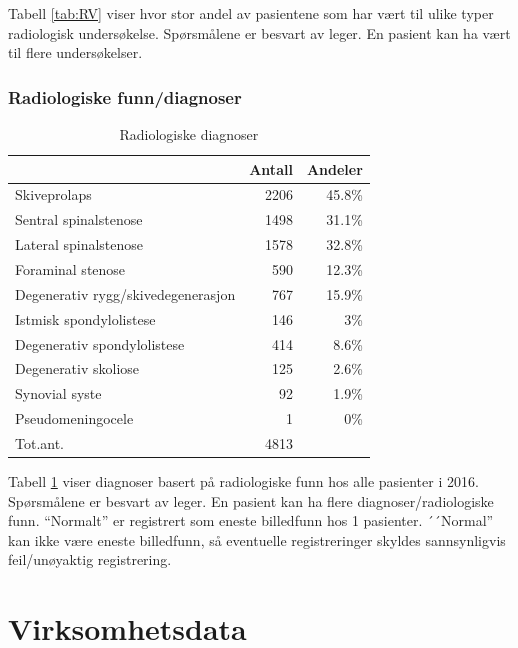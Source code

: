 \documentclass [norsk,a4paper,twoside]{article}\usepackage[]{graphicx}\usepackage[]{color}
\begin{document}
Tabell \ref{tab:RV} viser hvor stor andel av pasientene som har vært til ulike typer 
radiologisk undersøkelse. 
Spørsmålene er besvart av leger. En pasient kan ha vært til flere undersøkelser.


\subsubsection{Radiologiske funn/diagnoser}


\begin{table}[ht]
\centering
\begin{tabular}{lrr}
  \hline
 & Antall & Andeler \\ 
  \hline
Skiveprolaps & 2206 & 45.8\% \\ 
  Sentral spinalstenose & 1498 & 31.1\% \\ 
  Lateral spinalstenose & 1578 & 32.8\% \\ 
  Foraminal stenose & 590 & 12.3\% \\ 
  Degenerativ rygg/skivedegenerasjon & 767 & 15.9\% \\ 
  Istmisk spondylolistese & 146 & 3\% \\ 
  Degenerativ spondylolistese & 414 & 8.6\% \\ 
  Degenerativ skoliose & 125 & 2.6\% \\ 
  Synovial syste & 92 & 1.9\% \\ 
  Pseudomeningocele & 1 & 0\% \\ 
  Tot.ant. & 4813 &   \\ 
   \hline
\end{tabular}
\caption{Radiologiske diagnoser} 
\label{tab:RF}
\end{table}


Tabell \ref{tab:RF} viser diagnoser basert på radiologiske funn hos alle pasienter 
i 2016. 
Spørsmålene er besvart av leger.
En pasient kan ha flere diagnoser/radiologiske funn.
``Normalt'' er registrert som eneste billedfunn hos 1 pasienter.
      ´´Normal'' kan ikke være eneste billedfunn, så eventuelle registreringer skyldes sannsynligvis 
      feil/unøyaktig registrering.



\clearpage

\section{Virksomhetsdata}
\end{document}
